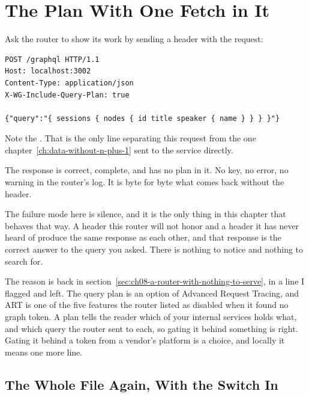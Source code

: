 \section{The Plan With One Fetch in It}
\label{sec:ch08-the-plan-with-one-fetch-in-it}

%
Ask the router to show its work by sending a header with the request:

\begin{verbatim}
POST /graphql HTTP/1.1
Host: localhost:3002
Content-Type: application/json
X-WG-Include-Query-Plan: true

{"query":"{ sessions { nodes { id title speaker { name } } } }"}
\end{verbatim}

%
Note the . That is the only line separating this request from the
one chapter~\ref{ch:data-without-n-plus-1} sent to the service directly.

%
The response is correct, complete, and has no plan in it. No 
key, no error, no warning in the router's log. It is byte for byte what comes
back without the header.

%
The failure mode here is silence, and it is the only thing in this chapter that
behaves that way. A header this router will not honor and a
header it has never heard of produce the same response as each other, and that
response is the correct answer to the query you asked. There is nothing to
notice and nothing to search for.

%
The reason is back in section~\ref{sec:ch08-a-router-with-nothing-to-serve}, in
a line I flagged and left. The query plan is an option of Advanced Request
Tracing, and ART is one of the five features the router listed as disabled when
it found no graph token. A plan tells the reader which of your internal services
holds what, and which query the router sent to each, so gating it behind
something is right. Gating it behind a token from a vendor's platform is a
choice, and locally it means one more line.

\subsection{The Whole File Again, With the Switch In}

